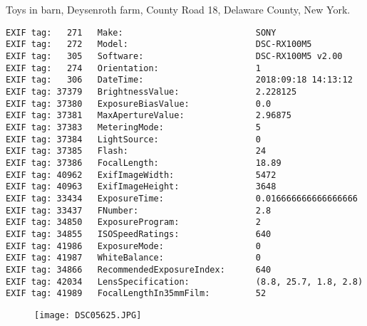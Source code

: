 \section{\protect{}}
\noindent Toys in barn, Deysenroth farm, County Road 18, Delaware County, New York.
\noindent
\begin{lstlisting}
EXIF tag:   271   Make:                          SONY
EXIF tag:   272   Model:                         DSC-RX100M5
EXIF tag:   305   Software:                      DSC-RX100M5 v2.00
EXIF tag:   274   Orientation:                   1
EXIF tag:   306   DateTime:                      2018:09:18 14:13:12
EXIF tag: 37379   BrightnessValue:               2.228125
EXIF tag: 37380   ExposureBiasValue:             0.0
EXIF tag: 37381   MaxApertureValue:              2.96875
EXIF tag: 37383   MeteringMode:                  5
EXIF tag: 37384   LightSource:                   0
EXIF tag: 37385   Flash:                         24
EXIF tag: 37386   FocalLength:                   18.89
EXIF tag: 40962   ExifImageWidth:                5472
EXIF tag: 40963   ExifImageHeight:               3648
EXIF tag: 33434   ExposureTime:                  0.016666666666666666
EXIF tag: 33437   FNumber:                       2.8
EXIF tag: 34850   ExposureProgram:               2
EXIF tag: 34855   ISOSpeedRatings:               640
EXIF tag: 41986   ExposureMode:                  0
EXIF tag: 41987   WhiteBalance:                  0
EXIF tag: 34866   RecommendedExposureIndex:      640
EXIF tag: 42034   LensSpecification:             (8.8, 25.7, 1.8, 2.8)
EXIF tag: 41989   FocalLengthIn35mmFilm:         52

\end{lstlisting}
\clearpage
\begin{figure}
\raggedleft
\texttt{[image: DSC05625.JPG]}
\end{figure}


\clearpage
